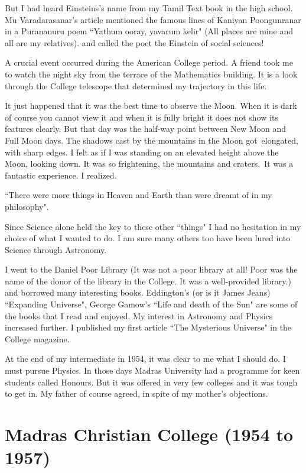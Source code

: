 But I had heard Einsteins's name from my Tamil Text book in the high 
school. Mu Varadarasanar's article mentioned the famous lines of Kaniyan 
Poongunranar in a Purananuru poem ``Yathum ooray, yavarum kelir"
(All places are mine and all are my relatives).
and called the poet the Einstein of social sciences!   


A crucial event occurred during the American College period. A friend 
took me to watch the night sky from the terrace\- of the Mathematics 
building. It is a look through the College telescope that determined my 
trajectory in this life.


It just happened that it was the best time to observe the Mo\-on. When it 
is dark of course you cannot view it and when it is fully bright it does 
not show its features clearly. But that day was the half-way point 
between New Moon and Full Moon days. The shadows cast by the mountains 
in the Moon got\ elongated, with sharp edges. I felt as if I was standing 
on an elevated height above the Moon, looking down. It was so 
frightening, the mountains and craters.\ It was a fantastic experience. I 
realized.


``There were more things in Heaven and Earth than were dreamt of in my 
philosophy".


Since Science alone held the key to these other ``things" I had no 
hesitation in my choice of what I wanted to do. I am sure many others 
too have been lured into Science through Astro\-nomy.
\vskip 1pt

I went to the Daniel Poor Library (It was not a poor library at all! 
Poor was the name of the donor of the library in the Co\-llege. It was a 
well-provided library.) and borrowed many inte\-resting books. Eddington's 
(or is it James Jeans) ``Expanding Universe", George Gamow's ``Life and 
death of the Sun" are some of the books that I read and enjoyed. My 
interest in Astronomy and Physics increased further. I published my 
first article ``The Mysterious Universe" in the College magazine.

At the end of my intermediate in 1954, it was clear to me what I should 
do. I must pursue Physics. In those days Madras University had a 
programme for keen students called Honours. But it was offered in very 
few colleges and it was tough to get in. My father of course agreed, 
in spite of my mother's objections.

\vspace{-.5cm}

\section*{Madras Christian College (1954 to 1957)}

